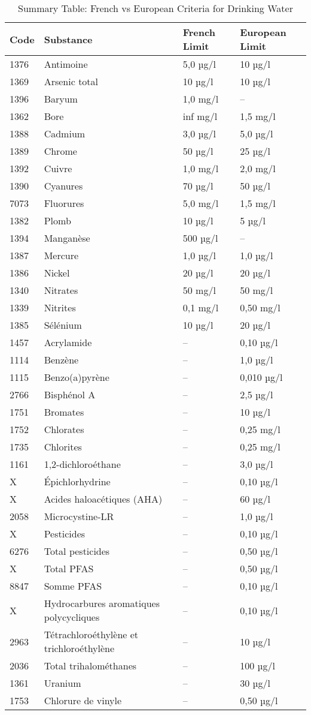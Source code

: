 \documentclass{article}
\begin{document}
\begin{table}[h!]
\centering
\begin{tabular}{|l|l|l|l|}
\hline
\textbf{Code} & \textbf{Substance} & \textbf{French Limit} & \textbf{European Limit} \\
\hline
1376 & Antimoine & 5,0 µg/l & 10 µg/l \\
1369 & Arsenic total & 10 µg/l & 10 µg/l \\
1396 & Baryum & 1,0 mg/l & -- \\
1362 & Bore & inf mg/l & 1,5 mg/l \\
1388 & Cadmium & 3,0 µg/l & 5,0 µg/l \\
1389 & Chrome & 50 µg/l & 25 µg/l \\
1392 & Cuivre & 1,0 mg/l & 2,0 mg/l \\
1390 & Cyanures & 70 µg/l & 50 µg/l \\
7073 & Fluorures & 5,0 mg/l & 1,5 mg/l \\
1382 & Plomb & 10 µg/l & 5 µg/l \\
1394 & Manganèse & 500 µg/l & -- \\
1387 & Mercure & 1,0 µg/l & 1,0 µg/l \\
1386 & Nickel & 20 µg/l & 20 µg/l \\
1340 & Nitrates & 50 mg/l & 50 mg/l \\
1339 & Nitrites & 0,1 mg/l & 0,50 mg/l \\
1385 & Sélénium & 10 µg/l & 20 µg/l \\
1457 & Acrylamide & -- & 0,10 µg/l \\
1114 & Benzène & -- & 1,0 µg/l \\
1115 & Benzo(a)pyrène & -- & 0,010 µg/l \\
2766 & Bisphénol A & -- & 2,5 µg/l \\
1751 & Bromates & -- & 10 µg/l \\
1752 & Chlorates & -- & 0,25 mg/l \\
1735 & Chlorites & -- & 0,25 mg/l \\
1161 & 1,2-dichloroéthane & -- & 3,0 µg/l \\
X & Épichlorhydrine & -- & 0,10 µg/l \\
X & Acides haloacétiques (AHA) & -- & 60 µg/l \\
2058 & Microcystine-LR & -- & 1,0 µg/l \\
X & Pesticides & -- & 0,10 µg/l \\
6276 & Total pesticides & -- & 0,50 µg/l \\
X & Total PFAS & -- & 0,50 µg/l \\
8847 & Somme PFAS & -- & 0,10 µg/l \\
X & Hydrocarbures aromatiques polycycliques & -- & 0,10 µg/l \\
2963 & Tétrachloroéthylène et trichloroéthylène & -- & 10 µg/l \\
2036 & Total trihalométhanes & -- & 100 µg/l \\
1361 & Uranium & -- & 30 µg/l \\
1753 & Chlorure de vinyle & -- & 0,50 µg/l \\
\hline
\end{tabular}
\caption{Summary Table: French vs European Criteria for Drinking Water}
\end{table}
\end{document}
